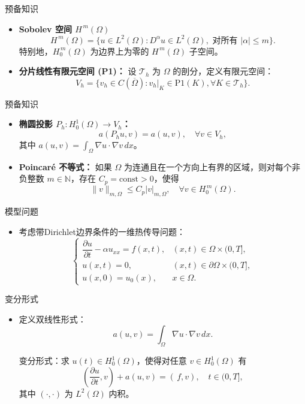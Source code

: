 \documentclass[aspectratio=169, xetex, 12pt]{beamer}  %
\begin{document}
\begin{frame}{预备知识}
	\begin{itemize}
		\item \textbf{Sobolev 空间 $H^{\,m}(\Omega)$}
		\[
		H^{\,m}(\Omega) = \{ u \in L^2(\Omega) : D^\alpha u \in L^2(\Omega), \text{ 对所有 } |\alpha| \le m \}.
		\]
		特别地，$H^{\,m}_0(\Omega)$ 为边界上为零的 $H^{\,m}(\Omega)$ 子空间。
		\vspace{2em}
		\item \textbf{分片线性有限元空间 (P1)：}
		设 $\mathcal{T}_h$ 为 $\Omega$ 的剖分，定义有限元空间：
		\[
		V_h = \{ v_h \in C(\overline{\Omega}) : v_h|_K \in \mathrm{P}1(K), \forall K \in \mathcal{T}_h\}.
		\]
	\end{itemize}
\end{frame}
\begin{frame}{预备知识}
	\begin{itemize}
		\item \textbf{椭圆投影 $P_h: H^1_0(\Omega) \to V_h$：}
		\[
		a(P_h u, v) = a(u, v), \quad \forall v \in V_h,
		\]
		其中 $a(u,v) = \int_{\Omega} \nabla u \cdot \nabla v \,dx$。
			\vspace{2em}
		\item \textbf{Poincaré 不等式：}
		如果 $\Omega$ 为连通且在一个方向上有界的区域，则对每个非负整数 $m \in \mathbb{N}$，存在 $C_p=\text{const} > 0$，使得
		\[
		\|v\|_{m,\Omega} \leq C_p |v|_{m,\Omega}, \quad \forall v \in H_0^{\,m}(\Omega).
		\]
	\end{itemize}
\end{frame}
\begin{frame}{模型问题}
	\begin{itemize}
		\item 	考虑带Dirichlet边界条件的一维热传导问题：
		\[
		\begin{cases}
			\dfrac{\partial u}{\partial t} - \alpha u_{xx} = f(x,t), & (x,t) \in \Omega \times (0,T], \\[4pt]
			u(x,t) = 0, & (x,t) \in \partial\Omega \times (0,T], \\[4pt]
			u(x,0) = u_0(x), & x \in \Omega.
		\end{cases}
		\]
	\end{itemize}

\end{frame}
	
	\begin{frame}{变分形式}
		\begin{itemize}
			\item 	定义双线性形式：
			\[
			a(u,v) = \int_{\Omega} \nabla u \cdot \nabla v \,dx.
			\]
		

		变分形式：求 \( u(t) \in H^1_0(\Omega) \)，使得对任意 \( v \in H^1_0(\Omega) \) 有
		\[
		\left( \frac{\partial u}{\partial t}, v \right) + a(u,v) = (\,f, v), \quad t \in (0,T],
		\]
		其中 \( (\cdot,\cdot) \) 为 \( L^2(\Omega) \) 内积。
	\end{itemize}
	\end{frame}
	
\end{document}
